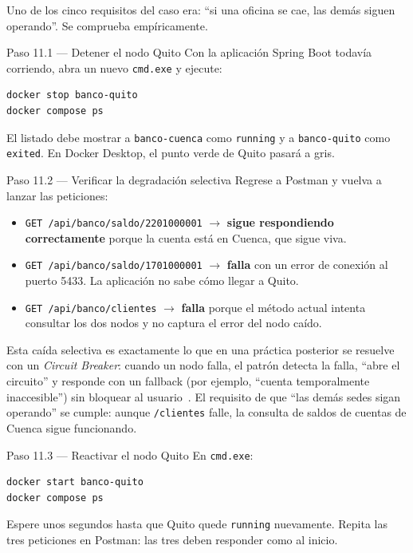 \documentclass[11pt,a4paper]{article}
\begin{document}
Uno de los cinco requisitos del caso era: ``si una oficina se cae, las dem\'as siguen operando''. Se comprueba emp\'iricamente.

\begin{pasobox}{Paso 11.1 --- Detener el nodo Quito}
Con la aplicaci\'on Spring Boot todav\'ia corriendo, abra un nuevo \texttt{cmd.exe} y ejecute:

\begin{lstlisting}[style=bashstyle]
docker stop banco-quito
docker compose ps
\end{lstlisting}

El listado debe mostrar a \texttt{banco-cuenca} como \texttt{running} y a \texttt{banco-quito} como \texttt{exited}. En Docker Desktop, el punto verde de Quito pasar\'a a gris.
\end{pasobox}

\begin{pasobox}{Paso 11.2 --- Verificar la degradaci\'on selectiva}
Regrese a Postman y vuelva a lanzar las peticiones:

\begin{itemize}[leftmargin=1.2em]
    \item \texttt{GET /api/banco/saldo/2201000001} $\rightarrow$ \textbf{sigue respondiendo correctamente} porque la cuenta est\'a en Cuenca, que sigue viva.
    \item \texttt{GET /api/banco/saldo/1701000001} $\rightarrow$ \textbf{falla} con un error de conexi\'on al puerto 5433. La aplicaci\'on no sabe c\'omo llegar a Quito.
    \item \texttt{GET /api/banco/clientes} $\rightarrow$ \textbf{falla} porque el m\'etodo actual intenta consultar los dos nodos y no captura el error del nodo ca\'ido.
\end{itemize}
\end{pasobox}

\begin{notabox}
Esta ca\'ida selectiva es exactamente lo que en una pr\'actica posterior se resuelve con un \emph{Circuit Breaker}: cuando un nodo falla, el patr\'on detecta la falla, ``abre el circuito'' y responde con un fallback (por ejemplo, ``cuenta temporalmente inaccesible'') sin bloquear al usuario~\cite{Newman2021Microservices}. El requisito de que ``las dem\'as sedes sigan operando'' se cumple: aunque \texttt{/clientes} falle, la consulta de saldos de cuentas de Cuenca sigue funcionando.
\end{notabox}

\begin{pasobox}{Paso 11.3 --- Reactivar el nodo Quito}
En \texttt{cmd.exe}:

\begin{lstlisting}[style=bashstyle]
docker start banco-quito
docker compose ps
\end{lstlisting}

Espere unos segundos hasta que Quito quede \texttt{running} nuevamente. Repita las tres peticiones en Postman: las tres deben responder como al inicio.
\end{pasobox}
\end{document}
